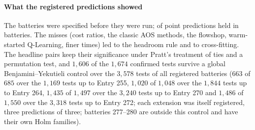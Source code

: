 \paragraph{What the registered predictions showed} The batteries were specified before they were run; \npredheld{} of \npredtotal{} point predictions held in \nbatteries{} batteries. The misses (cost ratios, the classic AOS methods, the flowshop, warm-started Q-Learning, finer times) led to the headroom rule and to cross-fitting. The headline pairs keep their significance under Pratt's treatment of ties and a permutation test, and $1{,}606$ of the $1{,}674$ confirmed tests survive a global Benjamini--Yekutieli control over the $3{,}578$ tests of all registered batteries ($663$ of $685$ over the $1{,}169$ tests up to Entry 255, $1{,}020$ of $1{,}048$ over the $1{,}844$ tests up to Entry 264, $1{,}435$ of $1{,}497$ over the $3{,}240$ tests up to Entry 270 and $1{,}486$ of $1{,}550$ over the $3{,}318$ tests up to Entry 272; each extension was itself registered, three predictions of three; batteries 277--280 are outside this control and have their own Holm families).

